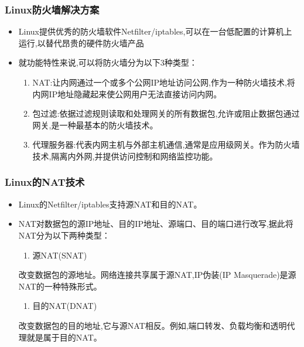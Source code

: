\documentclass[xcolor=svgnames,presentation]{beamer}
\begin{document}
\begin{frame}
\frametitle{Linux防火墙解决方案}
\label{sec-1-9}
\begin{itemize}

\item Linux提供优秀的防火墙软件Netfilter/iptables,可以在一台低配置的计算机上运行,以替代昂贵的硬件防火墙产品
\label{sec-1-9-1}%

\item 就功能特性来说,可以将防火墙分为以下3种类型：
\label{sec-1-9-2}%
\begin{enumerate}
\item NAT:让内网通过一个或多个公网IP地址访问公网,作为一种防火墙技术,将内网IP地址隐藏起来使公网用户无法直接访问内网。
\item 包过滤:依据过滤规则读取和处理网关的所有数据包,允许或阻止数据包通过网关,是一种最基本的防火墙技术。
\item 代理服务器:代表内网主机与外部主机通信,通常是应用级网关。作为防火墙技术,隔离内外网,并提供访问控制和网络监控功能。
\end{enumerate}
\end{itemize} %
\end{frame}
\begin{frame}
\frametitle{Linux的NAT技术}
\label{sec-1-10}
\begin{itemize}

\item Linux的Netfilter/iptables支持源NAT和目的NAT。
\label{sec-1-10-1}%

\item NAT对数据包的源IP地址、目的IP地址、源端口、目的端口进行改写,据此将NAT分为以下两种类型：
\label{sec-1-10-2}%
\begin{enumerate}
\item 源NAT(SNAT)
\end{enumerate}
改变数据包的源地址。网络连接共享属于源NAT,IP伪装(IP Masquerade)是源NAT的一种特殊形式。
\begin{enumerate}
\item 目的NAT(DNAT)
\end{enumerate}
改变数据包的目的地址,它与源NAT相反。例如,端口转发、负载均衡和透明代理就是属于目的NAT。
\end{itemize} %
\end{frame}
\end{document}
